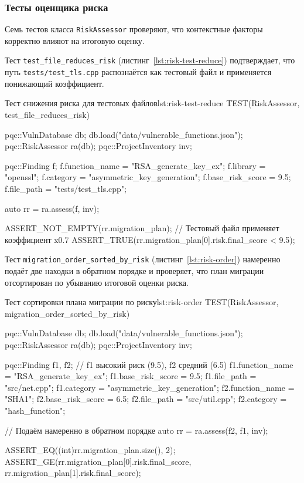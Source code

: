 \subsubsection{Тесты оценщика риска}

Семь тестов класса \texttt{RiskAssessor} проверяют, что контекстные
факторы корректно влияют на итоговую оценку.

Тест \texttt{test\_file\_reduces\_risk}
(листинг~\ref{lst:risk-test-reduce}) подтверждает, что путь
\texttt{tests/test\_tls.cpp} распознаётся как тестовый файл и
применяется понижающий коэффициент.

\begin{itmolisting}[C++]{Тест снижения риска для тестовых файлов}{lst:risk-test-reduce}
TEST(RiskAssessor, test_file_reduces_risk) {
    pqc::VulnDatabase db;
    db.load("data/vulnerable_functions.json");
    pqc::RiskAssessor ra(db);
    pqc::ProjectInventory inv;

    pqc::Finding f;
    f.function_name  = "RSA_generate_key_ex";
    f.library        = "openssl";
    f.category       = "asymmetric_key_generation";
    f.base_risk_score = 9.5;
    f.file_path       = "tests/test_tls.cpp";

    auto rr = ra.assess({f}, inv);

    ASSERT_NOT_EMPTY(rr.migration_plan);
    // Тестовый файл применяет коэффициент x0.7
    ASSERT_TRUE(rr.migration_plan[0].risk.final_score < 9.5);
}
\end{itmolisting}

Тест \texttt{migration\_order\_sorted\_by\_risk}
(листинг~\ref{lst:risk-order}) намеренно подаёт две находки в
обратном порядке и проверяет, что план миграции отсортирован по
убыванию итоговой оценки риска.

\begin{itmolisting}[C++]{Тест сортировки плана миграции по риску}{lst:risk-order}
TEST(RiskAssessor, migration_order_sorted_by_risk) {
    pqc::VulnDatabase db;
    db.load("data/vulnerable_functions.json");
    pqc::RiskAssessor ra(db);
    pqc::ProjectInventory inv;

    pqc::Finding f1, f2;
    // f1 высокий риск (9.5), f2 средний (6.5)
    f1.function_name = "RSA_generate_key_ex"; f1.base_risk_score = 9.5;
    f1.file_path = "src/net.cpp";  f1.category = "asymmetric_key_generation";
    f2.function_name = "SHA1";     f2.base_risk_score = 6.5;
    f2.file_path = "src/util.cpp"; f2.category = "hash_function";

    // Подаём намеренно в обратном порядке
    auto rr = ra.assess({f2, f1}, inv);

    ASSERT_EQ((int)rr.migration_plan.size(), 2);
    ASSERT_GE(rr.migration_plan[0].risk.final_score,
              rr.migration_plan[1].risk.final_score);
}
\end{itmolisting}

